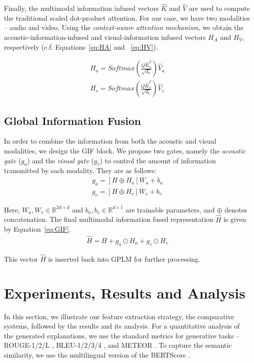 \documentclass[11pt]{article}
\begin{document}
Finally, the multimodal information infused vectors $\hat K$ and $\hat V$ are used to compute the traditional scaled dot-product attention. For our case, we have two modalities -- audio and video. Using the \textit{context-aware attention mechanism}, we obtain the acoustic-information-infused and visual-information infused vectors $H_A$ and $H_V$, respectively (c.f. Equations~\ref{eq:HA} and ~\ref{eq:HV}).

\vspace{-5mm}
\begin{eqnarray}
    H_a = Softmax(\frac{Q\hat K_a^T}{\sqrt{d_k}})\hat V_a 
    \label{eq:HA}\\
    H_v = Softmax(\frac{Q\hat K_v^T}{\sqrt{d_k}})\hat V_v
    \label{eq:HV}
\end{eqnarray}

\subsection{Global Information Fusion}
In order to combine the information from both the acoustic and visual modalities, we design the GIF block. We propose two gates, namely the \textit{acoustic gate}  ($g_a$) and the \textit{visual gate} ($g_v$) to control the amount of information transmitted by each modality. They are as follows:
\begin{eqnarray}
    g_a = [H \oplus H_a] W_a + b_a \\
    g_v = [H \oplus H_v] W_v + b_v
\end{eqnarray}

Here, $W_a, W_v \in \mathbb{R}^{2d \times d}$ and $b_a, b_v \in \mathbb{R}^{d \times 1}$ are trainable parameters, and $\oplus$ denotes concatenation. The final multimodal information fused representation $\hat H$ is given by Equation~\ref{eq:GIF}.
\begin{eqnarray}
\hat H = H + g_a \odot H_a + g_v \odot H_v
    \label{eq:GIF}
\end{eqnarray}

This vector $\hat H$ is inserted back into GPLM for further processing.

\section{Experiments, Results and Analysis}
In this section, we illustrate our feature extraction strategy, the comparative systems, followed by the results and its analysis. For a quantitative analysis of the generated explanations,  we use the standard metrics for generative tasks -- ROUGE-1/2/L \cite{lin-2004-rouge}, BLEU-1/2/3/4 \cite{papineni2002bleu}, and METEOR \cite{denkowski:lavie:meteor-wmt:2014}. To capture the semantic similarity, we use the multilingual version of the BERTScore \citep{zhang2019bertscore}.
\end{document}
